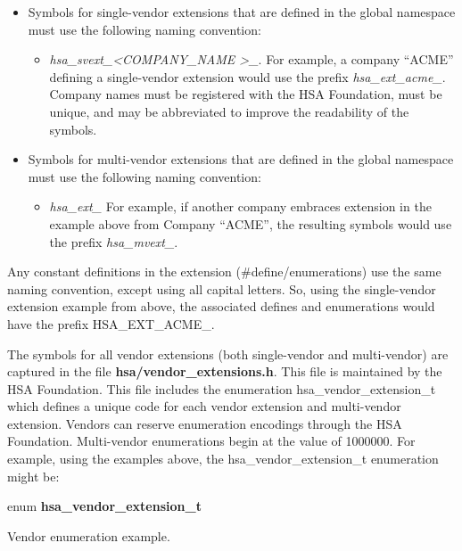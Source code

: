 \documentclass{book}
\newcommand{\hsadef}[2]{\hypertarget{#1}{\textbf{#2}}}
\newcommand{\reftyp}[1]{#1}
\newcommand{\refenu}[1]{\reftyp{#1}}
\begin{document}
\begin{itemize}
\item Symbols for single-vendor extensions that are defined in the
global namespace must use the following naming convention:
  \begin{itemize}
    \item \emph{hsa\_svext\_\textless COMPANY\_NAME \textgreater\_}.
    For example, a company ``ACME'' defining a single-vendor extension
    would use the prefix \emph{hsa\_ext\_acme\_}. Company names must
    be registered with the HSA Foundation, must be unique, and may be
    abbreviated to improve the readability of the symbols.
  \end{itemize}
\item Symbols for multi-vendor extensions that are defined in the
global namespace must use the following naming convention:
  \begin{itemize}
    \item \emph{hsa\_ext\_} For example, if another company
    embraces extension in the example above from Company ``ACME'', the
    resulting symbols would use the prefix \emph{hsa\_mvext\_}.
  \end{itemize}
\end{itemize}

Any constant definitions in the extension (\#define/enumerations) use
the same naming convention, except using all capital letters. So,
using the single-vendor extension example from above, the associated
defines and enumerations would have the prefix
\refenu{HSA\_EXT\_ACME\_}.

The symbols for all vendor extensions (both single-vendor and
multi-vendor) are captured in the file {\bf hsa/vendor\_extensions.h}.
This file is maintained by the HSA Foundation.  This file includes
the enumeration \reftyp{hsa\_vendor\_extension\_t} which defines a
unique code for each vendor extension and multi-vendor extension.
Vendors can reserve enumeration encodings through the HSA
Foundation. Multi-vendor enumerations begin at the value of
1000000. For example, using the examples above, the
\reftyp{hsa\_vendor\_extension\_t} enumeration might be:

\makeatletter{}

\noindent\begin{tcolorbox}[nobeforeafter,arc=0mm,colframe=white,colback=lightgray,left=0mm]
enum \hsadef{group__vendor__ext_1gaa8dfc9ba0911c03af38071bd3ae0df00}{hsa\_vendor\_extension\_t}
\end{tcolorbox}
Vendor enumeration example.
\end{document}
